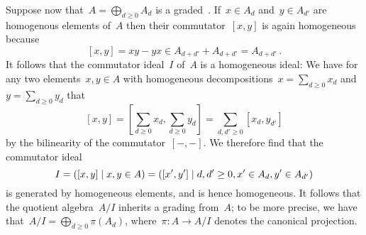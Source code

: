 Suppose now that~$A = \bigoplus_{d \geq 0} A_d$ is a graded~{\kalg}.
If~$x \in A_d$ and~$y \in A_{d'}$ are homogenous elements of~$A$ then their commutator~$[x,y]$ is again homogeneous because
\[
      [x,y]
  =   xy - yx
  \in A_{d + d'} + A_{d + d'}
  =   A_{d + d'} \,.
\]
It follows that the commutator ideal~$I$ of~$A$ is a homogeneous ideal:
We have for any two elements~$x, y \in A$ with homogeneous decompositions~$x = \sum_{d \geq 0} x_d$ and~$y = \sum_{d \geq 0} y_d$ that
\[
    [x,y]
  = \left[
      \sum_{d \geq 0} x_d,
      \sum_{d \geq 0} y_d
    \right]
  = \sum_{d, d' \geq 0} [x_d, y_{d'}]
\]
by the bilinearity of the commutator~$[-,-]$.
We therefore find that the commutator ideal
\[
    I
  = \genideal{
      [x,y]
    \suchthat 
      x, y \in A
    }
  = \genideal{
      [x', y']
    \suchthat
      d, d' \geq 0,
      x' \in A_d,
      y' \in A_{d'}
    }
\]
is generated by homogeneous elements, and is hence homogeneous.
It follows that the quotient algebra~$A/I$ inherits a grading from~$A$;
to be more precise, we have that~$A/I = \bigoplus_{d \geq 0} \pi(A_d)$, where~$\pi \colon A \to A/I$ denotes the canonical projection.

